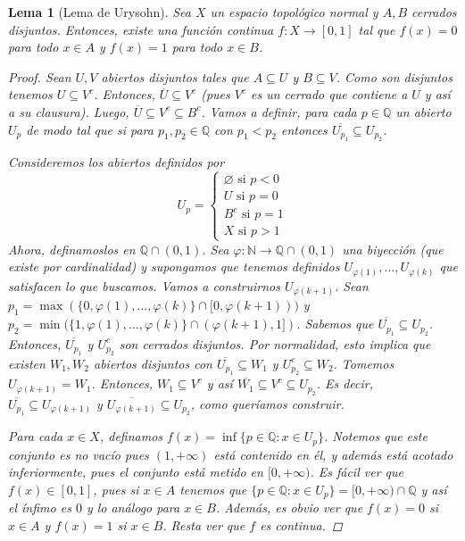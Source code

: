 \documentclass[12pt]{book}
\newtheorem{lem}[teo]{Lema}
\theoremstyle{definition}
\newcommand{\NN}{\mathbb{N}}
\newcommand{\QQ}{\mathbb{Q}}
\let\emptyset\varnothing
\begin{document}
\begin{lem}[Lema de Urysohn]
Sea $X$ un espacio topológico normal y $A,B$ cerrados disjuntos. Entonces, existe una función continua $f:X\to [0,1]$ tal que $f(x)=0$ para todo $x\in A$ y $f(x)=1$ para todo $x\in B$.
\begin{proof}
Sean $U,V$ abiertos disjuntos tales que $A\subseteq U$ y $B\subseteq V$. Como son disjuntos tenemos $U\subseteq V^c$. Entonces, $\overline{U}\subseteq V^c$ (pues $V^c$ es un cerrado que contiene a $U$ y así a su clausura). Luego, $\overline{U}\subseteq V^c \subseteq B^c$. Vamos a definir, para cada $p\in\QQ$ un abierto $U_p$ de modo tal que si para $p_1,p_2\in\QQ$ con $p_1<p_2$ entonces $\overline{U_{p_1}}\subseteq U_{p_2}$.

Consideremos los abiertos definidos por $$U_p = \begin{cases} \emptyset \text{ si }p<0 \\ U \text{ si }p=0 \\ B^c \text{ si }p=1 \\ X \text{ si }p>1\end{cases}$$ Ahora, definamoslos en $\QQ\cap (0,1)$. Sea $\varphi:\NN\to \QQ\cap (0,1)$ una biyección (que existe por cardinalidad) y supongamos que tenemos definidos $U_{\varphi(1)},\ldots , U_{\varphi(k)}$ que satisfacen lo que buscamos. Vamos a construirnos $U_{\varphi(k+1)}$. Sean $p_1 = \max(\{0,\varphi(1),\ldots , \varphi(k)\}\cap [0,\varphi(k+1)))$ y $p_2 = \min(\{1,\varphi(1),\ldots , \varphi(k)\}\cap (\varphi(k+1),1])$. Sabemos que $\overline{U_{p_1}}\subseteq U_{p_2}$. Entonces, $\overline{U_{p_1}}$ y $U_{p_2}^c$ son cerrados disjuntos. Por normalidad, esto implica que existen $W_1,W_2$ abiertos disjuntos con $\overline{U_{p_1}}\subseteq W_1$ y $U_{p_2}^c \subseteq W_2$. Tomemos $U_{\varphi(k+1)} = W_1$. Entonces, $W_1\subseteq V^c$ y así $\overline{W_1}\subseteq V^c\subseteq U_{p_2}$. Es decir, $\overline{U_{p_1}}\subseteq U_{\varphi(k+1)}$ y $\overline{U_{\varphi(k+1)}}\subseteq U_{p_2}$, como queríamos construir.

Para cada $x\in X$, definamos $f(x) = \inf \{p\in\QQ : x\in U_p\}$. Notemos que este conjunto es no vacío pues $(1,+\infty)$ está contenido en él, y además está acotado inferiormente, pues el conjunto está metido en $[0,+\infty)$. Es fácil ver que $f(x)\in [0,1]$, pues si $x\in A$ tenemos que $\{p\in \QQ : x\in U_p\} = [0,+\infty)\cap\QQ$ y así el ínfimo es $0$ y lo análogo para $x\in B$. Además, es obvio ver que $f(x)=0$ si $x\in A$ y $f(x)=1$ si $x\in B$. Resta ver que $f$ es continua.


\end{proof}
\end{lem}
\end{document}
